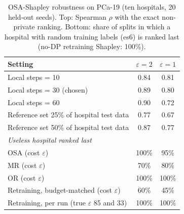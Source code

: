 \begin{table}[t]
\caption{OSA-Shapley robustness on PCa-19 (ten hospitals, 20 held-out seeds). Top: Spearman $\rho$ with the exact non-private ranking. Bottom: share of splits in which a hospital with random training labels (es6) is ranked last (no-DP retraining Shapley: 100\%).}
\centering\scriptsize
\begin{tabular}{lcc}
\toprule
Setting & $\varepsilon=2$ & $\varepsilon=1$ \\
\midrule
Local steps = 10 & 0.84 & 0.81 \\
Local steps = 30 (chosen) & 0.89 & 0.80 \\
Local steps = 60 & 0.90 & 0.72 \\
Reference set 25\% of hospital test data & 0.77 & 0.67 \\
Reference set 50\% of hospital test data & 0.87 & 0.77 \\
\midrule
\multicolumn{3}{l}{\emph{Useless hospital ranked last}} \\
OSA (cost $\varepsilon$) & 100\% & 95\% \\
MR (cost $\varepsilon$) & 70\% & 80\% \\
OR (cost $\varepsilon$) & 100\% & 100\% \\
Retraining, budget-matched (cost $\varepsilon$) & 60\% & 45\% \\
Retraining, per run (true $\varepsilon$ 85 and 33) & 100\% & 100\% \\
\bottomrule
\end{tabular}
\label{tab:osa_robust}
\end{table}
